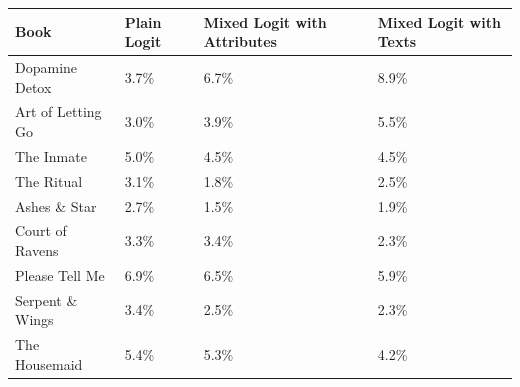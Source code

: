 \begin{centering}
\begin{tabular}{>{\raggedright}p{5cm}>{\raggedright}p{2cm}>{\centering}p{2cm}>{\centering}p{2cm}}
\hline
{\footnotesize\textbf{Book}} & {\footnotesize\textbf{Plain Logit}} & {\footnotesize\textbf{Mixed Logit with Attributes}} & {\footnotesize\textbf{Mixed Logit with Texts}}\tabularnewline
\hline
{\footnotesize Dopamine Detox} & {\footnotesize 3.7\%} & {\footnotesize 6.7\%} & {\footnotesize 8.9\%}\tabularnewline
{\footnotesize Art of Letting Go} & {\footnotesize 3.0\%} & {\footnotesize 3.9\%} & {\footnotesize 5.5\%}\tabularnewline
{\footnotesize The Inmate} & {\footnotesize 5.0\%} & {\footnotesize 4.5\%} & {\footnotesize 4.5\%}\tabularnewline
{\footnotesize The Ritual} & {\footnotesize 3.1\%} & {\footnotesize 1.8\%} & {\footnotesize 2.5\%}\tabularnewline
{\footnotesize Ashes \& Star} & {\footnotesize 2.7\%} & {\footnotesize 1.5\%} & {\footnotesize 1.9\%}\tabularnewline
{\footnotesize Court of Ravens} & {\footnotesize 3.3\%} & {\footnotesize 3.4\%} & {\footnotesize 2.3\%}\tabularnewline
{\footnotesize Please Tell Me} & {\footnotesize 6.9\%} & {\footnotesize 6.5\%} & {\footnotesize 5.9\%}\tabularnewline
{\footnotesize Serpent \& Wings} & {\footnotesize 3.4\%} & {\footnotesize 2.5\%} & {\footnotesize 2.3\%}\tabularnewline
{\footnotesize The Housemaid} & {\footnotesize 5.4\%} & {\footnotesize 5.3\%} & {\footnotesize 4.2\%}\tabularnewline
\hline
\end{tabular}
\par\end{centering}